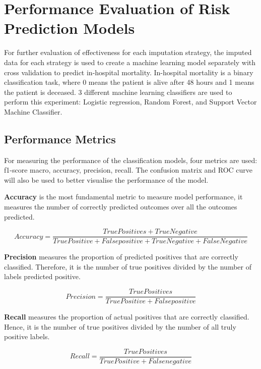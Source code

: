 \documentclass{l4proj}
\begin{document}
\section{Performance Evaluation of Risk Prediction Models}
For further evaluation of effectiveness for each imputation strategy, the imputed data for each strategy is used to create a machine learning model separately with cross validation to predict in-hospital mortality. In-hospital mortality is a binary classification task, where 0 means the patient is alive after 48 hours and 1 means the patient is deceased. 3 different machine learning classifiers are used to perform this experiment: Logistic regression, Random Forest, and Support Vector Machine Classifier. 

\subsection{Performance Metrics}

For measuring the performance of the classification models, four metrics are used: f1-score
macro, accuracy, precision, recall. The confusion matrix and ROC curve will also be used to
better visualise the performance of the model.

\textbf{Accuracy} is the most fundamental metric to measure model performance, it measures the
number of correctly predicted outcomes over all the outcomes predicted.

\begin{equation} \label{eq:1}
Accuracy = \frac{True Positives + True Negative}{True Positive + False positive + True Negative + False Negative}
\end{equation}

\textbf{Precision} measures the proportion of predicted positives that are correctly classified. Therefore,
it is the number of true positives divided by the number of labels predicted positive.

\begin{equation} \label{eq:2}
Precision = \frac{True Positives}{True Positive + False positive}
\end{equation}

\pagebreak

\textbf{Recall} measures the proportion of actual positives that are correctly classified. Hence, it is the
number of true positives divided by the number of all truly positive labels.

\begin{equation} \label{eq:3}
Recall = \frac{True Positives}{True Positive + False negative}
\end{equation}
\end{document}
